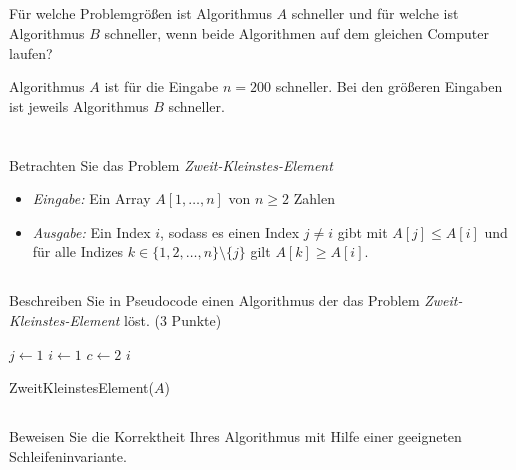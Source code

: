 \documentclass[12pt]{article}
\theoremstyle{remark}
\begin{document}
\subsection{}

Für welche Problemgrößen ist Algorithmus $A$ schneller und für welche ist Algorithmus $B$ schneller, wenn beide Algorithmen auf dem gleichen Computer laufen?

Algorithmus $A$ ist für die Eingabe $n = 200$ schneller. Bei den größeren Eingaben ist jeweils Algorithmus $B$ schneller.  

\section{}

Betrachten Sie das Problem {\it Zweit-Kleinstes-Element}
\begin{itemize}
    \item {\it Eingabe:} Ein Array $A[1, \ldots, n]$ von $n \geq 2$ Zahlen
    
    \item {\it Ausgabe:} Ein Index $i$, sodass es einen Index $j \neq i$ gibt mit $A[j] \leq A[i]$ und für alle Indizes $k \in \{ 1, 2, \ldots , n \} \setminus \{ j \}$ gilt $A[k] \geq A[i]$.

\end{itemize}

\subsection{}

Beschreiben Sie in Pseudocode einen Algorithmus der das Problem {\it Zweit-Kleinstes-Element} löst. (3 Punkte) \\

\begin{algorithm}[H]
\SetAlgoLined

 $j \gets 1$\; %
 $i \gets 1$\; %
 $c \gets 2$\;
 \Return $i$\;
\caption{ZweitKleinstesElement($A$)}
\end{algorithm}

\subsection{} Beweisen Sie die Korrektheit Ihres Algorithmus mit Hilfe einer geeigneten Schleifeninvariante.
\end{document}
